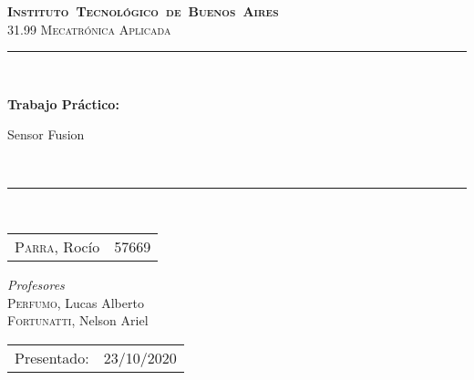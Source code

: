 
\begin{titlepage}
\newcommand{\HRule}{\rule{\linewidth}{0.5mm}}
\center
\mbox{\textsc{\LARGE \bfseries {Instituto Tecnol\'ogico de Buenos Aires}}}\\[1.5cm]
\textsc{\Large 31.99 Mecatr\'onica Aplicada}\\[0.5cm]


\HRule \\[0.6cm]
{ \Huge \bfseries Trabajo Pr\'actico:  

 Sensor Fusion
%
 }\\[0.4cm] %
\HRule \\[1.5cm]

\vfill
{\large


\begin{tabular}{lr} 	
\textsc{Parra}, Roc\'io  & 57669 \\
\end{tabular}

\vspace{50px}

\emph{Profesores}\\
\vspace{3px}
\textsc{Perfumo}, Lucas Alberto\\ 
\textsc{Fortunatti}, Nelson Ariel\\
\vspace{100px}

\begin{tabular}{ll}

Presentado: & 23/10/2020\\


\end{tabular}

}

\vfill

\end{titlepage}